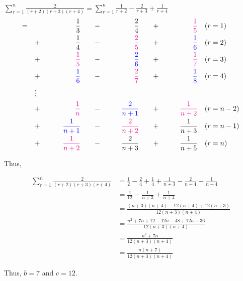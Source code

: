 \documentclass[
  a4paper,
]{report}
\begin{document}
\begin{tcolorbox}
\(\sum_{r=1}^{n}\frac{2}{(r+2)(r+3)(r+4)} = \sum_{r=1}^{n}\frac{1}{r+2}-\frac{2}{r+3}+\frac{1}{r+4}\)
\begin{alignat*}{4}
= \quad & \qquad & \frac{1}{3}&  \qquad - &\qquad \frac{2}{4} & \qquad + & \qquad   \textcolor{magenta}{\frac{1}{5}}  & \quad (r=1) \\
& + & \quad  \frac{1}{4}& \qquad - & \qquad \textcolor{magenta}{\frac{2}{5}} & \qquad + & \qquad  \textcolor{blue}{\frac{1}{6}}  & \quad (r=2)\\
& + & \quad \textcolor{magenta}{\frac{1}{5}} & \qquad - & \qquad \textcolor{blue}{\frac{2}{6}} & \qquad + & \qquad  \textcolor{magenta}{\frac{1}{7}}  & \quad (r=3)\\
& + & \quad \textcolor{blue}{\frac{1}{6}} & \qquad - & \qquad \textcolor{magenta}{\frac{2}{7}} & \qquad + & \qquad  \textcolor{blue}{\frac{1}{8}}  & \quad (r=4)\\
&\vdots & & \quad & \\
& + & \quad \textcolor{magenta}{\frac{1}{n}}& \qquad - & \textcolor{blue}{\qquad \frac{2}{n+1}} & \qquad + & \qquad \textcolor{magenta}{\frac{1}{n+2}}  & \quad (r=n-2)\\
& + & \quad  \textcolor{blue}{\frac{1}{n+1}}& \qquad - & \textcolor{magenta}{\qquad \frac{2}{n+2}} & \qquad + & \qquad  \frac{1}{n+3}  & \quad (r=n-1)\\
& + & \quad  \textcolor{magenta}{\frac{1}{n+2}}& \qquad - & \qquad \frac{2}{n+3} & \qquad + & \qquad  \frac{1}{n+5}  & \quad (r=n) 
\end{alignat*}

Thus,

\begin{equation*}
\begin{split}
\sum_{r=1}^{n}\frac{2}{(r+2)(r+3)(r+4)}&= \frac{1}{2}-\frac{2}{4}+\frac{1}{4}+\frac{1}{n+3}-\frac{2}{n+4}+\frac{1}{n+4}\\
&=\frac{1}{12}-\frac{1}{n+3}+\frac{1}{n+4}\\
&= \frac{(n+3)(n+4)-12(n+4)+12(n+3)}{12(n+3)(n+4)}\\
&= \frac{n^2+7n+12-12n-48+12n+36}{12(n+3)(n+4)}\\
&= \frac{n^2+7n}{12(n+3)(n+4)}\\
&= \frac{n(n+7)}{12(n+3)(n+4)}
\end{split}
\end{equation*}

Thus, \(b=7\) and \(c=12\).

\end{tcolorbox}
\end{document}
